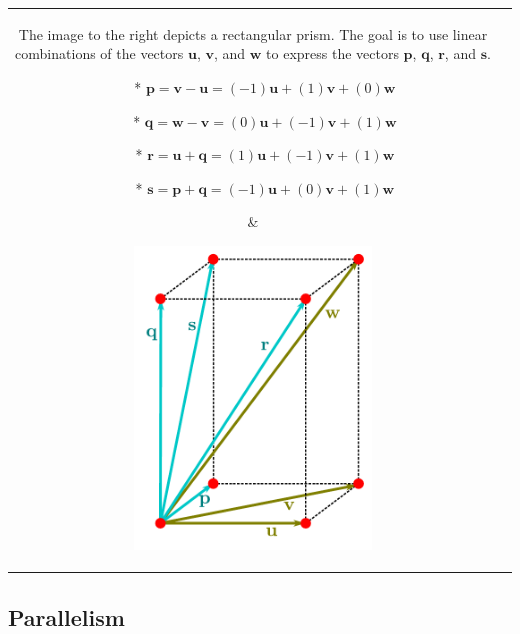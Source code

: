 \documentclass{article}
\begin{document}
\begin{center}
\begin{tabular}{cc}
\parbox{0.5\textwidth}{
The image to the right depicts a rectangular prism. The goal is to use linear combinations of the vectors \(\mathbf{u}\), \(\mathbf{v}\), and \(\mathbf{w}\) to express the vectors \(\mathbf{p}\), \(\mathbf{q}\), \(\mathbf{r}\), and \(\mathbf{s}\). 
\begin{itemize}
\item[*] \(\mathbf{p} = \mathbf{v} - \mathbf{u} = (-1)\mathbf{u} + (1)\mathbf{v} + (0)\mathbf{w}\)
\item[*] \(\mathbf{q} = \mathbf{w} - \mathbf{v} = (0)\mathbf{u} + (-1)\mathbf{v} + (1)\mathbf{w}\)
\item[*] \(\mathbf{r} = \mathbf{u} + \mathbf{q} = (1)\mathbf{u} + (-1)\mathbf{v} + (1)\mathbf{w}\)
\item[*] \(\mathbf{s} = \mathbf{p} + \mathbf{q} = (-1)\mathbf{u} + (0)\mathbf{v} + (1)\mathbf{w}\)
\end{itemize}
} & \parbox{0.5\textwidth}{
\includegraphics[width = 0.5\textwidth]{displacement_vector_lin_comb_example}
}
\end{tabular}
\end{center}


\subsection*{Parallelism}
\end{document}
